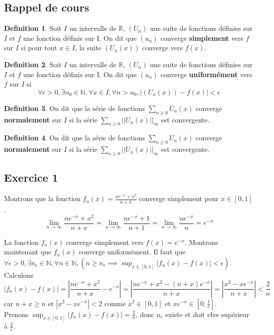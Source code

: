 \documentclass[]{book}
\theoremstyle{definition}
\newtheorem{defn}{Definition}
\newcommand{\bb}[1]{\mathbb{#1}}
\newcommand{\R}{\bb{R}}
\newcommand{\N}{\bb{N}}
\begin{document}
\subsection*{Rappel de cours}
\begin{defn}
Soit $I$ un intervalle de $\R$,  $(U_n)$ une suite de fonctions d\'efinies sur $I$ et $f$ une fonction d\'efinie sur I.
On dit que $(u_n)$ converge \textbf{simplement} vers $f$ sur $I$ si pour tout $x \in I$, la suite $(U_n(x))$ converge vers $f(x)$.
\end{defn}

\begin{defn}
Soit $I$ un intervalle de $\R$,  $(U_n)$ une suite de fonctions d\'efinies sur $I$ et $f$ une fonction d\'efinie sur I.
On dit que $(u_n)$ converge \textbf{uniform\'ement} vers $f$ sur $I$ si
$$\forall \epsilon > 0, \exists n_0 \in \N, \forall x \in I, \forall n > n_0, |(U_n(x)) - f(x)| < \epsilon$$
\end{defn}

\begin{defn}
On dit que la s\'erie de fonctions $\sum_{n\geq0}U_n(x)$ converge \textbf{normalement} sur  $I$ si la s\'erie $\sum_{n\geq0}||U_n(x)||_{\infty}$ est convergente.
 \end{defn}

\begin{defn}
On dit que la s\'erie de fonctions $\sum_{n\geq0}U_n(x)$ converge \textbf{normalement} sur  $I$ si la s\'erie $\sum_{n\geq0}||U_n(x)||_{\infty}$ est convergente.
\end{defn}


\newpage
\subsection*{Exercice 1}
Montrons que la fonction $f_n(x)=\frac{ne^{-x}+x^2}{n+x}$ converge simplement pour $x \in [0,1]$.
$$\lim_{n \to \infty}\frac{ne^{-x}+x^2}{n+x} = \lim_{n \to \infty}\frac{ne^{-x}+1}{n+1} = \lim_{n \to \infty}\frac{ne^{-x}}{n} = e^{-x}$$

La fonction $f_n(x)$ converge simplement vers $f(x) = e^{-x}$. Montrons maintenant que $f_n(x)$ converge uniform\'ement. Il faut que $\forall \epsilon > 0, \exists n_{\epsilon} \in \N, \forall n \in \N, (n \geq n_{\epsilon} \implies \sup_{x \in [0,1]} |f_n(x)-f(x)| < \epsilon)$.
Calculons 
$$|f_n(x)-f(x)| = \left|\frac{ne^{-x}+x^2}{n+x} - e^{-x}\right| = \left|\frac{ne^{-x}+x^2-(n+x)e^{-x}}{n+x}\right| = \left|\frac{x^2-xe^{-x}}{n+x}\right| < \frac{2}{n}$$
car $n+x \geq n$ et $|x^2-xe^{-x}| < 2$ comme $x^2 \in [0,1]$ et $xe^{-x} \in [0, \frac{1}{e}]$.\\ 
Prenons $\sup_{x \in [0,1]} |f_n(x)-f(x)| = \frac{2}{n}$, donc $n_{\epsilon}$ existe et doit e\^tre sup\'erieur \`a $\frac{2}{\epsilon}$.
\end{document}
